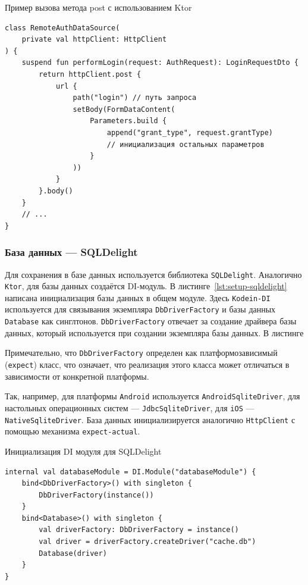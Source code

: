 \documentclass[14pt, russian]{scrartcl}
\begin{document}
\begin{listing}[!htb]
\caption{Пример вызова метода post с использованием Ktor}
\label{lst:ktor-post}
\begin{verbatim}
class RemoteAuthDataSource(
    private val httpClient: HttpClient
) {
    suspend fun performLogin(request: AuthRequest): LoginRequestDto {
        return httpClient.post {
            url {
                path("login") // путь запроса
                setBody(FormDataContent(
                    Parameters.build {
                        append("grant_type", request.grantType)
                        // инициализация остальных параметров
                    }
                ))
            }
        }.body()
    }
    // ...
}
\end{verbatim}
\end{listing}

\subsubsection{База данных --- SQLDelight}\label{sect:sqldelight}

Для сохранения в базе данных используется библиотека \texttt{SQLDelight}. Аналогично \texttt{Ktor}, для базы данных создаётся DI-модуль. В листинге~\ref{lst:setup-sqldelight} написана инициализация базы данных в общем модуле. Здесь \texttt{Kodein-DI} используется для связывания экземпляра \texttt{DbDriverFactory} и базы данных \texttt{Database} как синглтонов. \texttt{DbDriverFactory} отвечает за создание драйвера базы данных, который используется при создании экземпляра базы данных. В листинге

Примечательно, что \texttt{DbDriverFactory} определен как платформозависимый (\texttt{expect}) класс, что означает, что реализация этого класса может отличаться в зависимости от конкретной платформы.

Так, например, для платформы \texttt{Android} используется \texttt{AndroidSqliteDriver}, для настольных операционных систем --- \texttt{JdbcSqliteDriver}, для \texttt{iOS} --- \texttt{NativeSqliteDriver}. База данных инициализируется аналогично \texttt{HttpClient} с помощью механизма \texttt{expect-actual}.

\begin{listing}[!htb]
\caption{Инициализация DI модуля для SQLDelight}
\label{lst:setup-sqldelight}
\begin{verbatim}
internal val databaseModule = DI.Module("databaseModule") {
    bind<DbDriverFactory>() with singleton {
        DbDriverFactory(instance())
    }
    bind<Database>() with singleton {
        val driverFactory: DbDriverFactory = instance()
        val driver = driverFactory.createDriver("cache.db")
        Database(driver)
    }
}
\end{verbatim}
\end{listing}
\end{document}
